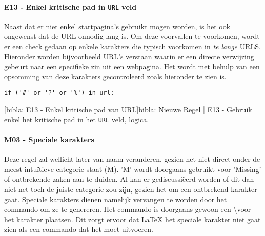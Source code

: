 \paragraph{E13 - Enkel kritische pad in \texttt{URL} veld}
Naast dat er niet enkel startpagina's gebruikt mogen worden, is het ook ongewenst dat de URL onnodig lang is. Om deze voorvallen te voorkomen, wordt er een check gedaan op enkele karakters die typisch voorkomen in \emph{te lange} URLS. Hieronder worden bijvoorbeeld URL's verstaan waarin er een directe verwijzing gebeurt naar een specifieke zin uit een webpagina. Het wordt met behulp van een opsomming van deze karakters gecontroleerd zoals hieronder te zien is.
\begin{verbatim}
if ('#' or '?' or '%') in url:
\end{verbatim}
[bibla: E13 - Enkel kritische pad van URL]{bibla: Nieuwe Regel | E13 - Gebruik enkel het kritische pad in het \texttt{URL} veld, logica. \label{lst:bibla_NR_E13}}


\paragraph{M03 - Speciale karakters}

Deze regel zal wellicht later van naam veranderen, gezien het niet direct onder de meest intuïtieve categorie staat (M). 'M' wordt doorgaans gebruikt voor 'Missing' of ontbrekende zaken aan te duiden. Al kan er gediscussiëerd worden of dit dan niet net toch de juiste categorie zou zijn, gezien het om een ontbrekend karakter gaat. Speciale karakters dienen namelijk vervangen te worden door het commando om ze te genereren. Het commando is doorgaans gewoon een \backslash voor het karakter plaatsen. Dit zorgt ervoor dat LaTeX het speciale karakter niet gaat zien als een commando dat het moet uitvoeren. 


